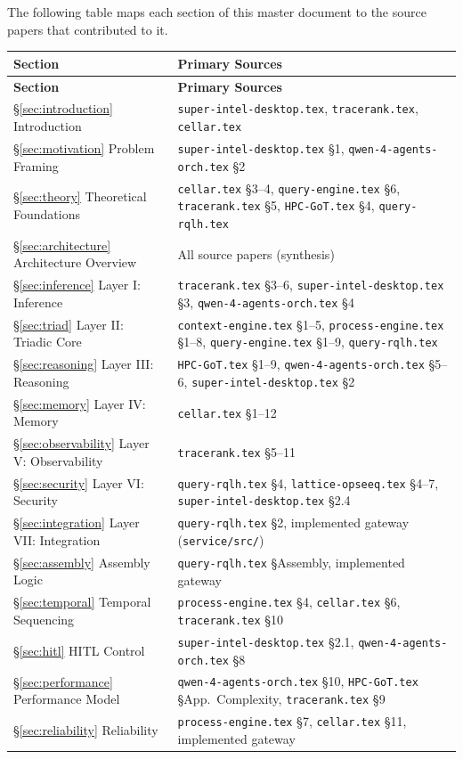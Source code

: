 \documentclass[11pt]{article}
\theoremstyle{remark}
\begin{document}
The following table maps each section of this master document to the source papers that contributed to it.

{\small
\begin{longtable}{p{5.5cm}p{8.5cm}}
\toprule
\textbf{Section} & \textbf{Primary Sources} \\
\midrule
\endfirsthead
\toprule
\textbf{Section} & \textbf{Primary Sources} \\
\midrule
\endhead
\S\ref{sec:introduction} Introduction & \texttt{super-intel-desktop.tex}, \texttt{tracerank.tex}, \texttt{cellar.tex} \\
\S\ref{sec:motivation} Problem Framing & \texttt{super-intel-desktop.tex} \S1, \texttt{qwen-4-agents-orch.tex} \S2 \\
\S\ref{sec:theory} Theoretical Foundations & \texttt{cellar.tex} \S3--4, \texttt{query-engine.tex} \S6, \texttt{tracerank.tex} \S5, \texttt{HPC-GoT.tex} \S4, \texttt{query-rqlh.tex} \\
\S\ref{sec:architecture} Architecture Overview & All source papers (synthesis) \\
\S\ref{sec:inference} Layer I: Inference & \texttt{tracerank.tex} \S3--6, \texttt{super-intel-desktop.tex} \S3, \texttt{qwen-4-agents-orch.tex} \S4 \\
\S\ref{sec:triad} Layer II: Triadic Core & \texttt{context-engine.tex} \S1--5, \texttt{process-engine.tex} \S1--8, \texttt{query-engine.tex} \S1--9, \texttt{query-rqlh.tex} \\
\S\ref{sec:reasoning} Layer III: Reasoning & \texttt{HPC-GoT.tex} \S1--9, \texttt{qwen-4-agents-orch.tex} \S5--6, \texttt{super-intel-desktop.tex} \S2 \\
\S\ref{sec:memory} Layer IV: Memory & \texttt{cellar.tex} \S1--12 \\
\S\ref{sec:observability} Layer V: Observability & \texttt{tracerank.tex} \S5--11 \\
\S\ref{sec:security} Layer VI: Security & \texttt{query-rqlh.tex} \S4, \texttt{lattice-opseeq.tex} \S4--7, \texttt{super-intel-desktop.tex} \S2.4 \\
\S\ref{sec:integration} Layer VII: Integration & \texttt{query-rqlh.tex} \S2, implemented gateway (\texttt{service/src/}) \\
\S\ref{sec:assembly} Assembly Logic & \texttt{query-rqlh.tex} \S Assembly, implemented gateway \\
\S\ref{sec:temporal} Temporal Sequencing & \texttt{process-engine.tex} \S4, \texttt{cellar.tex} \S6, \texttt{tracerank.tex} \S10 \\
\S\ref{sec:hitl} HITL Control & \texttt{super-intel-desktop.tex} \S2.1, \texttt{qwen-4-agents-orch.tex} \S8 \\
\S\ref{sec:performance} Performance Model & \texttt{qwen-4-agents-orch.tex} \S10, \texttt{HPC-GoT.tex} \S App.~Complexity, \texttt{tracerank.tex} \S9 \\
\S\ref{sec:reliability} Reliability & \texttt{process-engine.tex} \S7, \texttt{cellar.tex} \S11, implemented gateway \\
\bottomrule
\end{longtable}
}
\end{document}
